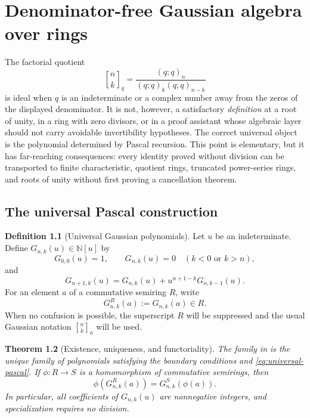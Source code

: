 \documentclass[11pt,oneside,openany]{book}
\newtheorem{theorem}{Theorem}[chapter]
\theoremstyle{definition}
\newtheorem{definition}[theorem]{Definition}
\theoremstyle{remark}
\newcommand{\qbinom}[2]{\genfrac{[}{]}{0pt}{}{#1}{#2}_{q}}
\newcommand{\Qbinom}[3]{\genfrac{[}{]}{0pt}{}{#1}{#2}_{#3}}
\newcommand{\N}{\mathbb N}
\begin{document}
\chapter{Denominator-free Gaussian algebra over rings}\label{chap:universal-gaussian}

The factorial quotient
\[
  \qbinom nk=\frac{(q;q)_n}{(q;q)_k(q;q)_{n-k}}
\]
is ideal when $q$ is an indeterminate or a complex number away from the zeros of the displayed denominator.  It is not, however, a satisfactory \emph{definition} at a root of unity, in a ring with zero divisors, or in a proof assistant whose algebraic layer should not carry avoidable invertibility hypotheses.  The correct universal object is the polynomial determined by Pascal recursion.  This point is elementary, but it has far-reaching consequences: every identity proved without division can be transported to finite characteristic, quotient rings, truncated power-series rings, and roots of unity without first proving a cancellation theorem.

\section{The universal Pascal construction}

\begin{definition}[Universal Gaussian polynomials]\label{def:universal-gaussian}
Let $u$ be an indeterminate.  Define $G_{n,k}(u)\in\N[u]$ by
\[
 G_{0,0}(u)=1,
 \qquad
 G_{n,k}(u)=0\quad(k<0\text{ or }k>n),
\]
and
\begin{equation}
 G_{n+1,k}(u)=G_{n,k}(u)+u^{n+1-k}G_{n,k-1}(u).\label{eq:universal-pascal}
\end{equation}
For an element $a$ of a commutative semiring $R$, write
\[
 G^{R}_{n,k}(a):=G_{n,k}(a)\in R.
\]
When no confusion is possible, the superscript $R$ will be suppressed and the usual Gaussian notation $\Qbinom nk a$ will be used.
\end{definition}

\begin{theorem}[Existence, uniqueness, and functoriality]\label{thm:universal-functoriality}
The family in  is the unique family of polynomials satisfying the boundary conditions and \eqref{eq:universal-pascal}.  If $\phi:R\to S$ is a homomorphism of commutative semirings, then
\[
 \phi\!\left(G^R_{n,k}(a)\right)=G^S_{n,k}(\phi(a)).
\]
In particular, all coefficients of $G_{n,k}(u)$ are nonnegative integers, and specialization requires no division.
\end{theorem}
\end{document}
